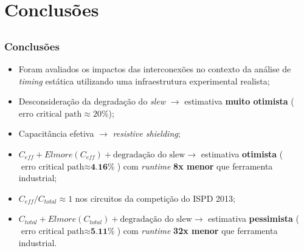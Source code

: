 \documentclass[10pt,a4paper]{beamer}
\begin{document}
	
	\section{Conclusões}
	\subsection*{}
		\begin{frame}[t]
		\frametitle{Conclusões}
			\begin{itemize}
				\item Foram avaliados os impactos das interconexões no contexto da análise de \textit{timing} estática utilizando uma infraestrutura experimental realista;			
			
				\item Desconsideração da degradação do \textit{slew} $\to$ estimativa \textbf{muito otimista} ($\text{erro critical path} \approx 20\%$);
				
				\item Capacitância efetiva $\to$ \textit{resistive shielding};
				
				\item $C_{eff} + Elmore(C_{eff}) + \text{degradação do slew} \to$ estimativa \textbf{otimista} ($\text{erro critical path} \approx \textbf{4.16\%}$) com \textit{runtime} \textbf{8x menor} que ferramenta industrial;
				
				\item $C_{eff} / C_{total} \approx 1$ nos circuitos da competição do ISPD 2013;
				
				\item $C_{total} + Elmore(C_{total}) + \text{degradação do slew} \to$ estimativa \textbf{pessimista}  ($\text{erro critical path} \approx \textbf{5.11\%}$) com \textit{runtime} \textbf{32x menor} que ferramenta industrial.
			\end{itemize}
		\end{frame}
		
\end{document}
